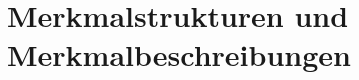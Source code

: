 \documentclass[handout,aspectratio=1610,dvipsnames]{beamer}
\begin{document}
  \section{Merkmalstrukturen und Merkmalbeschreibungen}
  \let\woopsi\section\let\section\subsection\let\subsection\subsubsection
  
  \let\subsection\section\let\section\woopsi
\end{document}
